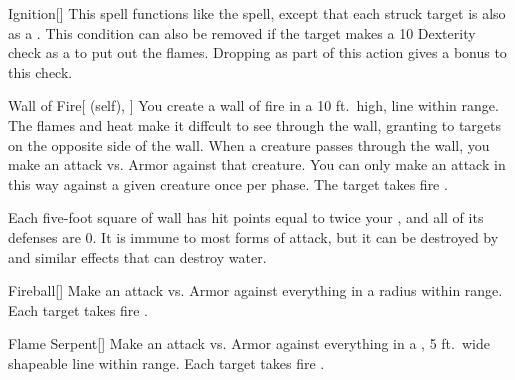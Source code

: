 \lowercase{\hypertarget{spell:Ignition}{}}\label{spell:Ignition}
\begin{apability}[\nth{2}]{\hypertarget{spell:Ignition}{Ignition}}[]
This spell functions like the  spell, except that each struck target is also  as a .
This condition can also be removed if the target makes a  10 Dexterity check as a  to put out the flames.
Dropping  as part of this action gives a  bonus to this check.
\end{apability}
\vspace{0.25em}



\lowercase{\hypertarget{spell:Wall of Fire}{}}\label{spell:Wall of Fire}
\begin{attuneability}[\nth{2}]{\hypertarget{spell:Wall of Fire}{Wall of Fire}}[ (self), ]
You create a wall of fire in a 10 ft.\ high, \arealarge line within \rngmed range.
The flames and heat make it diffcult to see through the wall, granting  to targets on the opposite side of the wall.
When a creature passes through the wall, you make an attack vs. Armor against that creature.
You can only make an attack in this way against a given creature once per phase.
\hit The target takes fire .

Each five-foot square of wall has hit points equal to twice your , and all of its defenses are 0.
It is immune to most forms of attack, but it can be destroyed by  and similar effects that can destroy water.
\end{attuneability}
\vspace{0.25em}



\lowercase{\hypertarget{spell:Fireball}{}}\label{spell:Fireball}
\begin{apability}[\nth{3}]{\hypertarget{spell:Fireball}{Fireball}}[]
Make an attack vs. Armor against everything in a \areamed radius within \rnglong range.
\hit Each target takes fire .
\end{apability}
\vspace{0.25em}



\lowercase{\hypertarget{spell:Flame Serpent}{}}\label{spell:Flame Serpent}
\begin{apability}[\nth{3}]{\hypertarget{spell:Flame Serpent}{Flame Serpent}}[]
Make an attack vs. Armor against everything in a \arealarge, 5 ft.\ wide shapeable line within \rngmed range.
\hit Each target takes fire .
\end{apability}
\vspace{0.25em}



